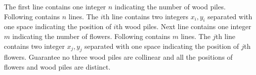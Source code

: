 The first line contains one integer $n$ indicating the number of  wood piles.
Following contains $n$ lines.
The $i$th line contains two integers $x_i,y_i$ separated with one space indicating the position of $i$th  wood piles.
Next line contains one integer $m$ indicating the number of flowers.
Following contains $m$ lines.
The $j$th line contains two integer $x_j,y_j$ separated with one space indicating the position of $j$th flowers.
Guarantee no three wood piles are collinear and all the positions of flowers and wood piles are distinct.

